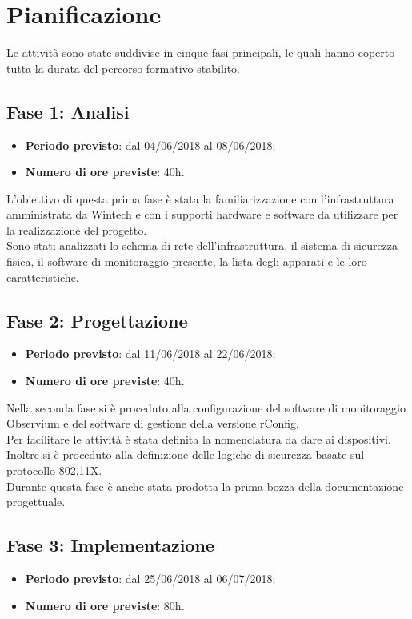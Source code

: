 \documentclass[Tesi.tex]{subfiles}
\begin{document}
\clearpage\thispagestyle{empty}\mbox{}\clearpage
\newpage

\chapter{Pianificazione}
Le attività sono state suddivise in cinque fasi principali, le quali hanno coperto tutta la durata del percorso formativo stabilito.

\section{Fase 1: Analisi}
\begin{itemize}
	\item \textbf{Periodo previsto}: dal 04/06/2018 al 08/06/2018;
	\item \textbf{Numero di ore previste}: 40h.
\end{itemize}

L'obiettivo di questa prima fase è stata la familiarizzazione con l'infrastruttura amministrata da Wintech e con i supporti hardware e software da utilizzare per la realizzazione del progetto. \\
Sono stati analizzati lo schema di rete dell'infrastruttura, il sistema di sicurezza fisica, il software di monitoraggio presente, la lista degli apparati e le loro caratteristiche. 

\section{Fase 2: Progettazione}
\begin{itemize}
	\item \textbf{Periodo previsto}: dal 11/06/2018 al 22/06/2018;
	\item \textbf{Numero di ore previste}: 40h.
\end{itemize}
	
Nella seconda fase si è proceduto alla configurazione del software di monitoraggio Observium e del software di gestione della versione rConfig. \\
Per facilitare le attività è stata definita la nomenclatura da dare ai dispositivi.\\
Inoltre si è proceduto alla definizione delle logiche di sicurezza basate sul protocollo 802.11X. \\
Durante questa fase è anche stata prodotta la prima bozza della documentazione progettuale.
	

\section{Fase 3: Implementazione}
\begin{itemize}
	\item \textbf{Periodo previsto}: dal 25/06/2018 al 06/07/2018;
	\item \textbf{Numero di ore previste}: 80h.
\end{itemize}
	
\end{document}
